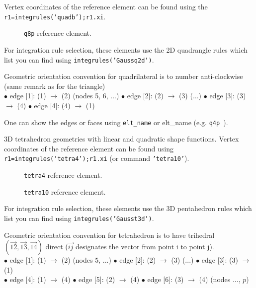 Vertex coordinates of the reference element can be found using the {\tt r1=integrules('quadb');r1.xi}.

\begin{figure}[H]
\centering
{} 
 \caption{{\tt q8p} reference element.}
\end{figure}

For integration rule selection, these elements use the 2D quadrangle rules which list you can find using {\tt integrules('Gaussq2d')}.

Geometric orientation convention for quadrilateral is to number anti-clockwise (same remark as for the triangle)\\
   $\bullet$ edge [1]: (1) $\rightarrow$ (2) (nodes 5, 6, ...) 
   $\bullet$ edge [2]: (2) $\rightarrow$ (3) (...) 
   $\bullet$ edge [3]: (3) $\rightarrow$ (4) 
   $\bullet$ edge [4]: (4) $\rightarrow$ (1)

One can show the edges or faces using {\tt {\ti elt\_name}}  or {\ti elt\_name}  (e.g. {\tt q4p }).


3D tetrahedron geometries with linear and quadratic shape functions. Vertex coordinates of the reference element can be found using {\tt r1=integrules('tetra4');r1.xi} (or command {\tt 'tetra10'}).

\begin{figure}[H]
\centering
{} %
 \caption{{\tt tetra4} reference element.}
\end{figure}

\begin{figure}[H]
\centering
{} %
 \caption{{\tt tetra10} reference element.}
\end{figure}

For integration rule selection, these elements use the 3D pentahedron rules which list you can find using {\tt integrules('Gausst3d')}.

Geometric orientation convention for tetrahedron is to have trihedral $(\vec{12},\vec{13},\vec{14})$ direct ($\vec{ij}$ designates the vector from point i to point j).\\
   $\bullet$ edge [1]: (1) $\rightarrow$ (2)  (nodes 5, ...) 
   $\bullet$ edge [2]: (2) $\rightarrow$ (3)  (...) 
   $\bullet$ edge [3]: (3) $\rightarrow$ (1)  \\
   $\bullet$ edge [4]: (1) $\rightarrow$ (4) 
   $\bullet$ edge [5]: (2) $\rightarrow$ (4) 
   $\bullet$ edge [6]: (3) $\rightarrow$ (4) (nodes ...,
   $p$)

